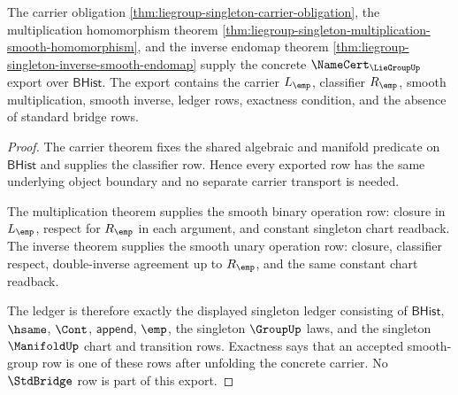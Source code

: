 \begin{theorem}
\label{thm:liegroup-singleton-smooth-group-namecert-export}
The carrier obligation
\autoref{thm:liegroup-singleton-carrier-obligation}, the multiplication
homomorphism theorem
\autoref{thm:liegroup-singleton-multiplication-smooth-homomorphism}, and the
inverse endomap theorem
\autoref{thm:liegroup-singleton-inverse-smooth-endomap} supply the concrete
$\NameCert_{\LieGroupUp}$ export over $\mathsf{BHist}$. The export contains the
carrier $L_{\emp}$, classifier $R_{\emp}$, smooth multiplication, smooth
inverse, ledger rows, exactness condition, and the absence of standard bridge
rows.
\end{theorem}
\begin{proof}
The carrier theorem fixes the shared algebraic and manifold predicate on
$\mathsf{BHist}$ and supplies the classifier row. Hence every exported row has
the same underlying object boundary and no separate carrier transport is
needed.

The multiplication theorem supplies the smooth binary operation row: closure in
$L_{\emp}$, respect for $R_{\emp}$ in each argument, and constant singleton
chart readback. The inverse theorem supplies the smooth unary operation row:
closure, classifier respect, double-inverse agreement up to $R_{\emp}$, and the
same constant chart readback.

The ledger is therefore exactly the displayed singleton ledger consisting of
$\mathsf{BHist}$, $\hsame$, $\Cont$, $\mathsf{append}$, $\emp$, the singleton
$\GroupUp$ laws, and the singleton $\ManifoldUp$ chart and transition rows.
Exactness says that an accepted smooth-group row is one of these rows after
unfolding the concrete carrier. No $\StdBridge$ row is part of this export.
\end{proof}
